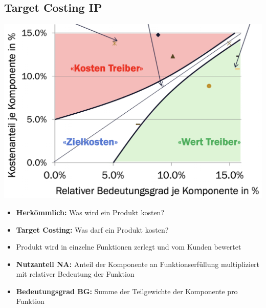 \subsection{Target Costing \hfill IP}
    \begin{scriptsize}
        \begin{center}
            \includegraphics[width = 0.6\linewidth]{src/images/MAEIP_Zielkostenmatrix}
        \end{center}
        \begin{itemize}
            \item \textbf{Herkömmlich:} Was wird ein Produkt kosten?
            \item \textbf{Target Costing:} Was darf ein Produkt kosten?
            \item Produkt wird in einzelne Funktionen zerlegt und vom Kunden bewertet
            \item \textbf{Nutzanteil NA:} Anteil der Komponente an Funktionserfüllung multipliziert mit relativer Bedeutung der Funktion
            \item \textbf{Bedeutungsgrad BG:} Summe der Teilgewichte der Komponente pro Funktion
        \end{itemize}
        \vspace{-2mm}
    \end{scriptsize}